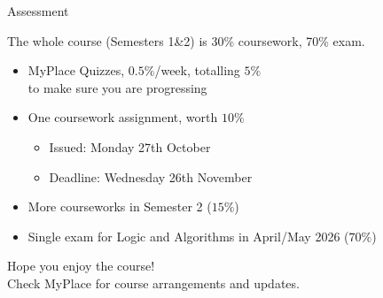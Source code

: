 \documentclass[xetex,aspectratio=169,14pt,hyperref={pdfpagelabels=true,pdflang={en-GB}}]{beamer}
\begin{document}
\begin{frame}
  {Assessment}

  The whole course (Semesters 1\&2) is 30\% coursework, 70\% exam.

  \bigskip

  \begin{itemize}
  \item MyPlace Quizzes, $0.5\%$/week, totalling $5\%$ \\
    \textcolor{black!60}{to make sure you are progressing}
  \item One coursework assignment, worth $10\%$
    \begin{itemize}
    \item Issued: Monday 27th October
    \item Deadline: Wednesday 26th November
    \end{itemize}
  \item More courseworks in Semester 2 ($15\%$)
  \item Single exam for Logic and Algorithms in April/May 2026 ($70\%$)
  \end{itemize}

  \bigskip


\end{frame}

\begin{frame}
  \begin{center}
    {\Huge Hope you enjoy the course!} \\
    Check MyPlace for course arrangements and updates.
  \end{center}
\end{frame}
\end{document}
